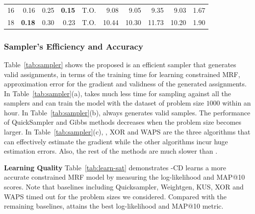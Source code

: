 \begin{table}[!t]
\begin{tabular}{r|rrrrrrrrr}
        16      & 0.16                                                                                                & 0.25           & \textbf{0.15}  & T.O.           & 9.08           & 9.05           & 9.35         & 9.03           & 1.67     \\
        18      & \textbf{0.18}                                                                                       & 0.30           & 0.23           & T.O.           & 10.44          & 10.30          & 11.73        & 10.20          & 1.90     \\
        \hline
    \end{tabular}
\end{table}

\subsubsection*{Sampler's Efficiency and Accuracy}  Table~\ref{tab:sampler} shows the proposed \nls is an efficient sampler that
generates valid assignments, in terms of the training time for learning
constrained MRF, approximation error for the gradient and validness of the
generated assignments. In Table~\ref{tab:sampler}(a), \nls takes much less time
for sampling against all the samplers and can train the model with the dataset
of problem size $1000$ within an hour. In Table~\ref{tab:sampler}(b), \nls
always generates valid samples. {The performance of} QuickSampler and Gibbs
methods decreases when the problem size becomes larger. In
Table~\ref{tab:sampler}(c), \nls, XOR and WAPS are the three algorithms that
can effectively estimate the gradient while the other algorithms incur huge
estimation errors. Also, the rest of the methods are much slower than \nls. %

\noindent\textbf{Learning Quality}  Table~\ref{tab:learn-sat} demonstrates \nls-CD learns a more accurate  constrained MRF model by measuring the log-likelihood and MAP@10 scores. Note that baselines including Quicksampler, Weightgen, KUS, XOR and WAPS  timed out for the problem sizes we considered. Compared with the remaining baselines,  \nls attains the best log-likelihood and MAP@10 metric.

